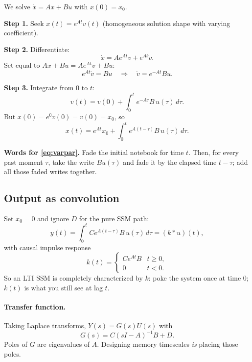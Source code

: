 \documentclass[11pt,a4paper]{article}
\begin{document}
We solve $\dot{x}=Ax+Bu$ with $x(0)=x_0$.

\textbf{Step 1.} Seek $x(t)=e^{At}v(t)$ (homogeneous solution shape with varying coefficient).

\textbf{Step 2.} Differentiate:
\begin{equation}
\dot{x}=A e^{At}v+e^{At}\dot{v}.
\end{equation}
Set equal to $Ax+Bu=A e^{At}v+Bu$:
\begin{equation}
e^{At}\dot{v}=Bu
\quad\Rightarrow\quad
\dot{v}=e^{-At}Bu.
\end{equation}

\textbf{Step 3.} Integrate from $0$ to $t$:
\begin{equation}
v(t)=v(0)+\int_0^t e^{-A\tau}B\,u(\tau)\,d\tau.
\end{equation}
But $x(0)=e^{0}v(0)=v(0)=x_0$, so
\begin{equation}
x(t)=e^{At}x_0+\int_0^t e^{A(t-\tau)}B\,u(\tau)\,d\tau.
\label{eq:varpar}
\end{equation}

\textbf{Words for \eqref{eq:varpar}.}
Fade the initial notebook for time $t$.
Then, for every past moment $\tau$, take the write $Bu(\tau)$ and fade it by the elapsed time $t-\tau$; add all those faded writes together.

\subsection{Output as convolution}

Set $x_0=0$ and ignore $D$ for the pure SSM path:
\begin{equation}
y(t)=\int_0^t C e^{A(t-\tau)}B\,u(\tau)\,d\tau=(k*u)(t),
\end{equation}
with causal impulse response
\begin{equation}
k(t)=
\begin{cases}
C e^{At}B & t\ge 0,\\
0 & t<0.
\end{cases}
\label{eq:kernel-c}
\end{equation}
So an LTI SSM is completely characterized by $k$: poke the system once at time 0; $k(t)$ is what you still see at lag $t$.

\paragraph{Transfer function.}
Taking Laplace transforms, $Y(s)=G(s)U(s)$ with
\begin{equation}
G(s)=C(sI-A)^{-1}B+D.
\end{equation}
Poles of $G$ are eigenvalues of $A$. Designing memory timescales \emph{is} placing those poles.
\end{document}
